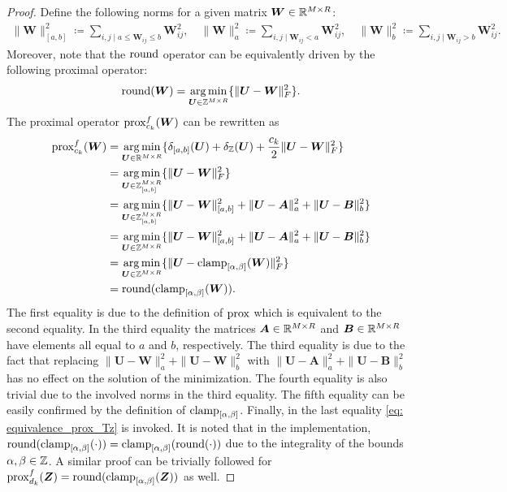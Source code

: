 \begin{proof}
    Define the following norms for a given matrix $\bm W \in \mathbb{R}^{M\times R}$:
    \begin{align*}
        \|\bm W\|_{[a,b]}^2 \coloneqq \sum_{i,j \mid a \leq \bm W_{ij} \leq b} \bm W_{ij}^2, \quad 
        \|\bm W\|_a^2 \coloneqq \sum_{i,j \mid \bm W_{ij} < a} \bm W_{ij}^2, \quad 
        \|\bm W\|_b^2 \coloneqq \sum_{i,j \mid \bm W_{ij} > b} \bm W_{ij}^2.
    \end{align*}
    Moreover, note that the $\operatorname{round}$ operator  can be equivalently driven by the following proximal operator:
    \begin{equation}
        \operatorname{round}(\bm W) = \operatorname*{arg\,min}_{\bm U \in \mathbb Z^{M\times R}}\{\|\bm U - \bm W\|^2_F\}.
        \label{eq: equivalence_prox_Tz}
    \end{equation}
    The proximal operator $\operatorname{prox}^f_{c_k}(\bm W)$ can be rewritten as
    \begin{align*}
        \operatorname{prox}^f_{c_k}(\bm W) &= \operatorname*{arg\,min}_{\bm U \in \mathbb{R}^{M\times R}}\{\delta_{[a,b]}(\bm U) + \delta_{\mathbb Z}(\bm U) + \frac{c_k}{2} \|\bm U - \bm W\|^2_F\}\\
        &= \operatorname*{arg\,min}_{\bm U \in \mathbb Z_{[a,b]}^{M\times R}}\{\|\bm U - \bm W\|^2_F\}\\
        &= \operatorname*{arg\,min}_{\bm U \in \mathbb Z_{[a,b]}^{M\times R}}\{\|\bm U - \bm W\|^2_{[a,b]} + \|\bm U - \bm A\|^2_a + \|\bm U - \bm B\|^2_b\}\\
        &= \operatorname*{arg\,min}_{\bm U \in \mathbb Z^{M\times R}}\{\|\bm U - \bm W\|^2_{[a,b]} + \|\bm U - \bm A\|^2_a + \|\bm U - \bm B\|^2_b\}\\
        &= \operatorname*{arg\,min}_{\bm U \in \mathbb Z^{M\times R}}\{\|\bm U - \operatorname{clamp}_{[\alpha,\beta]}(\bm W)\|^2_F\}\\
        &= \operatorname{round}(\operatorname{clamp}_{[\alpha,\beta]}(\bm W)).
    \end{align*}
    The first equality is due to the definition of $\operatorname{prox}$ which is equivalent to the second equality. 
    In the third equality the matrices $\bm A\in\mathbb{R}^{M\times R}$ and $\bm B\in\mathbb{R}^{M\times R}$ have elements all equal to $a$ and $b$, respectively.
    The third equality is due to the fact that replacing $\|\bm U - \bm W\|^2_a + \|\bm U - \bm W\|^2_b$ with $\|\bm U - \bm A\|^2_a + \|\bm U - \bm B\|^2_b$ has no effect on the solution of the minimization. The fourth equality is also trivial due to the involved norms in the third equality. The fifth equality can be easily confirmed by the definition of $\operatorname{clamp}_{[\alpha,\beta]}$. 
    Finally, in the last equality \eqref{eq: equivalence_prox_Tz} is invoked. 
    It is noted that in the implementation, $\operatorname{round}(\operatorname{clamp}_{[\alpha,\beta]}(\cdot)) = \operatorname{clamp}_{[\alpha,\beta]}(\operatorname{round}(\cdot))$ due to the integrality of the bounds $\alpha,\beta \in \mathbb Z$. A similar proof can be trivially followed for $\operatorname{prox}^f_{d_k}(\bm Z) = \operatorname{round}(\operatorname{clamp}_{[\alpha,\beta]}(\bm Z))$ as well.
\end{proof}
